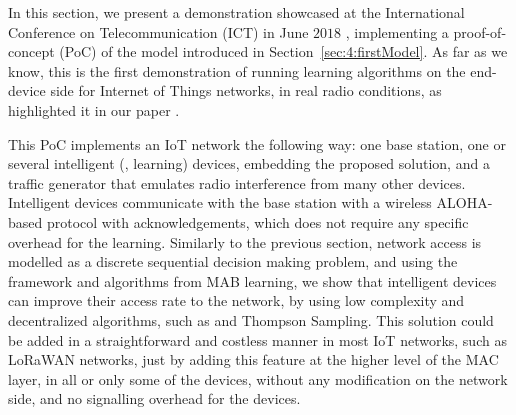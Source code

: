 

\graphicspath{{2-Chapters/4-Chapter/IEEE_WCNC_2019__DemoICT/pictures/}}

In this section, we present a demonstration showcased at the International Conference on Telecommunication (ICT) in June $2018$ \cite{Besson2018ICT,Besson2019WCNC}, implementing a proof-of-concept (PoC) of the model introduced in Section~\ref{sec:4:firstModel}.
%
As far as we know, this is the first demonstration of running learning algorithms on the end-device side for Internet of Things networks, in real radio conditions, as highlighted it in our paper \cite{MoyBesson2019}.

This PoC implements an IoT network the following way: one base station, one or several intelligent (\ie, learning) devices, embedding the proposed solution,
and a traffic generator that emulates radio interference from many other devices.
Intelligent devices communicate with the base station with a wireless ALOHA-based protocol with acknowledgements, which does not require any specific overhead for the learning.
%
Similarly to the previous section, network access is modelled as a discrete sequential decision making problem, and using the framework and algorithms from MAB learning, we show that intelligent devices can improve their access rate to the network, by using low complexity and decentralized algorithms, such as \UCB{} and Thompson Sampling.
%
This solution could be added in a straightforward and costless manner in most IoT networks, such as LoRaWAN networks, just by adding this feature at the higher level of the MAC layer, in all or only some of the devices, without any modification on the network side, and no signalling overhead for the devices.

